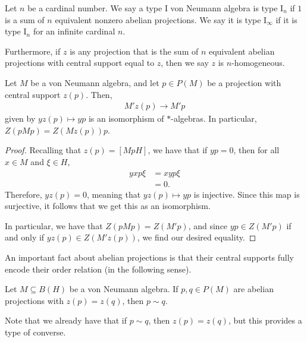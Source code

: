 \documentclass[10pt]{mypackage}
\begin{document}
\begin{definition}
  Let $n$ be a cardinal number. We say a type I von Neumann algebra is type $\text{I}_n$ if $1$ is a sum of $n$ equivalent nonzero abelian projections. We say it is type $\text{I}_{\infty}$ if it is type $\text{I}_n$ for an infinite cardinal $n$.

  Furthermore, if $z$ is any projection that is the sum of $n$ equivalent abelian projections with central support equal to $z$, then we say $z$ is $n$-homogeneous.
\end{definition}
\begin{lemma}
  Let $M$ be a von Neumann algebra, and let $p\in P(M)$ be a projection with central support $z(p)$. Then,
  \begin{align*}
    M'z(p) \rightarrow M'p
  \end{align*}
  given by $yz(p)\mapsto yp$ is an isomorphism of $\ast$-algebras. In particular, $Z\left( pMp \right) = Z\left( Mz(p) \right)p$.
\end{lemma}
\begin{proof}
  Recalling that $z(p) = \left[ MpH \right]$, we have that if $yp = 0$, then for all $x\in M$ and $\xi\in H$,
  \begin{align*}
    yxp\xi &= xyp\xi\\
           &= 0.
  \end{align*}
  Therefore, $yz(p) = 0$, meaning that $yz(p)\mapsto yp$ is injective. Since this map is surjective, it follows that we get this as an isomorphism.

  In particular, we have that $Z\left( pMp \right) = Z\left( M'p \right)$, and since $yp\in Z\left( M'p \right)$ if and only if $yz(p)\in Z\left( M'z(p) \right)$, we find our desired equality.
\end{proof}
An important fact about abelian projections is that their central supports fully encode their order relation (in the following sense).
\begin{lemma}
  Let $M\subseteq B(H)$ be a von Neumann algebra. If $p,q\in P(M)$ are abelian projections with $z(p) = z(q)$, then $p\sim q$.
\end{lemma}
Note that we already have that if $p\sim q$, then $z(p) = z(q)$, but this provides a type of converse.
\end{document}
